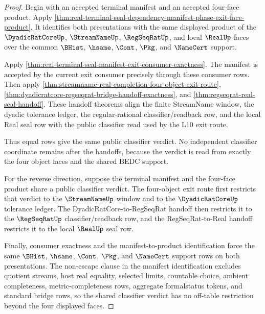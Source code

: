 \begin{proof}
Begin with an accepted terminal manifest and an accepted four-face product.
Apply
\autoref{thm:real-terminal-seal-dependency-manifest-phase-exit-face-product}.
It identifies both presentations with the same displayed product of the
$\DyadicRatCoreUp$, $\StreamNameUp$, $\RegSeqRatUp$, and local $\RealUp$ faces
over the common $\BHist$, $\hsame$, $\Cont$, $\Pkg$, and $\NameCert$ support.

Apply \autoref{thm:real-terminal-seal-manifest-exit-consumer-exactness}. The
manifest is accepted by the current exit consumer precisely through these
consumer rows. Then apply
\autoref{thm:streamname-real-completion-four-object-exit-route},
\autoref{thm:dyadicratcore-regseqrat-bridge-handoff-exactness}, and
\autoref{thm:regseqrat-real-seal-handoff}. These handoff theorems align the
finite StreamName window, the dyadic tolerance ledger, the regular-rational
classifier/readback row, and the local Real seal row with the public classifier
read used by the L10 exit route.

Thus equal rows give the same public classifier verdict. No independent
classifier coordinate remains after the handoffs, because the verdict is read
from exactly the four object faces and the shared BEDC support.

For the reverse direction, suppose the terminal manifest and the four-face
product share a public classifier verdict. The four-object exit route first
restricts that verdict to the $\StreamNameUp$ window and to the
$\DyadicRatCoreUp$ tolerance ledger. The DyadicRatCore-to-RegSeqRat handoff
then restricts it to the $\RegSeqRatUp$ classifier/readback row, and the
RegSeqRat-to-Real handoff restricts it to the local $\RealUp$ seal row.

Finally, consumer exactness and the manifest-to-product identification force
the same $\BHist$, $\hsame$, $\Cont$, $\Pkg$, and $\NameCert$ support rows on
both presentations. The non-escape clause in the manifest identification
excludes quotient streams, host real equality, selected limits, countable
choice, ambient completeness, metric-completeness rows, aggregate formalstatus
tokens, and standard bridge rows, so the shared classifier verdict has no
off-table restriction beyond the four displayed faces.
\end{proof}

